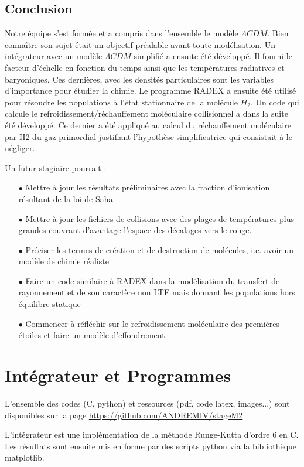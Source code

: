 \documentclass[10pt, a4paper]{report}
\numberwithin{equation}{subsection}
\begin{document}
\section*{Conclusion}
Notre équipe s'est formée et a compris dans l'ensemble le modèle $\Lambda CDM$. Bien connaître son sujet était un objectif préalable avant toute modélisation. Un intégrateur avec un modèle $\Lambda CDM$ simplifié a ensuite été développé. Il fourni le facteur d'échelle en fonction du temps ainsi que les températures radiatives et baryoniques. Ces dernières, avec les densités particulaires sont les variables d'importance pour étudier la chimie. Le programme RADEX a ensuite été utilisé pour résoudre les populations à l'état stationnaire de la molécule $H_2$. Un code qui calcule le refroidissement/réchauffement moléculaire collisionnel a dans la suite été développé. Ce dernier a été appliqué au calcul du réchauffement moléculaire par H2 du gaz primordial justifiant l'hypothèse simplificatrice qui consistait à le négliger.

Un futur stagiaire pourrait :
\begin{itemize}
	\item [$\bullet$] Mettre à jour les résultats préliminaires avec la fraction d'ionisation résultant de la loi de Saha
	\item [$\bullet$] Mettre à jour les fichiers de collisions avec des plages de températures plus grandes couvrant d'avantage l'espace des décalages vers le rouge.
	\item [$\bullet$] Préciser les termes de création et de destruction de molécules, i.e. avoir un modèle de chimie réaliste
	\item [$\bullet$] Faire un code similaire à RADEX dans la modélisation du transfert de rayonnement et de son caractère non LTE mais donnant les populations hors équilibre statique
	\item [$\bullet$] Commencer à réfléchir sur le refroidissement moléculaire des premières étoiles et faire un modèle d'effondrement
\end{itemize}
\newpage
\appendix

\chapter{Intégrateur et Programmes}
L'ensemble des codes (C, python) et ressources (pdf, code latex, images...) sont disponibles sur la page \url{https://github.com/ANDREMIV/stageM2}

L'intégrateur est une implémentation de la méthode Runge-Kutta d'ordre 6 en C. Les résultats sont ensuite mis en forme par des scripts python via la bibliothèque matplotlib.
\end{document}
